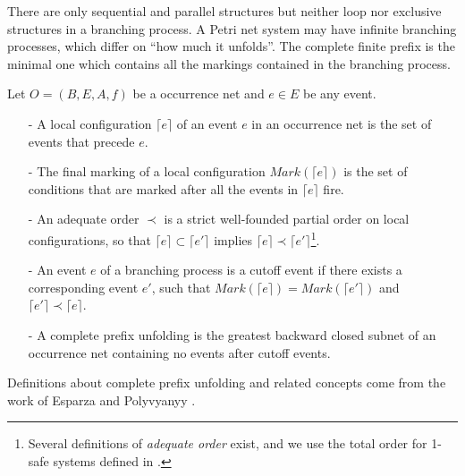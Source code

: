 \documentclass[dvips,...]{llncs}
\begin{document}
There are only sequential and parallel structures but neither loop nor exclusive structures in a branching process. A Petri net system may have infinite branching processes, which differ on ``how much it unfolds''. The complete finite prefix is the minimal one which contains all the markings contained in the branching process.

\begin{definition}\label{def:cpu}
Let $O=(B,E,A,f)$ be a occurrence net and $e\in E$ be any event.
	\begin{itemize}
		\item[-] A local configuration $\lceil e\rceil$ of an event $e$ in an occurrence net is the set of events that precede $e$.
		\item[-] The final marking of a local configuration $Mark(\lceil e\rceil)$ is the set of conditions that are marked after all the events in $\lceil e\rceil$ fire.
		\item[-] An adequate order $\prec$ is a strict well-founded partial order on local configurations, so that $\lceil e\rceil\subset\lceil e'\rceil$ implies $\lceil e\rceil\prec\lceil e'\rceil$\footnote{Several definitions of \textit{adequate order} exist, and we use the total order for 1-safe systems defined in \cite{esparza1996improvement}.}.
		\item[-] An event $e$ of a branching process is a cutoff event if there exists a corresponding event $e'$, such that $Mark(\lceil e\rceil)=Mark(\lceil e'\rceil)$ and $\lceil e'\rceil\prec\lceil e\rceil$.
		\item[-] A complete prefix unfolding is the greatest backward closed subnet of an occurrence net containing no events after cutoff events.
	\end{itemize}
\end{definition}

Definitions about complete prefix unfolding and related concepts come from the work of Esparza \cite{esparza1996improvement} and Polyvyanyy \cite{polyvyanyy2010structuring}.
\end{document}
